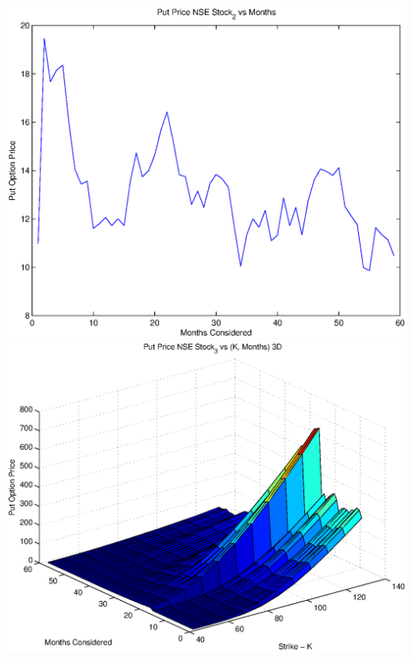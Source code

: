\documentclass{article}
\begin{document}
\includegraphics[width=\textwidth]{Put_Price_NSE_Stock_2_vs_Months} \\

\includegraphics[width=\textwidth]{Put_Price_NSE_Stock_3_vs_(K,_Months)_3D} \\
\end{document}
